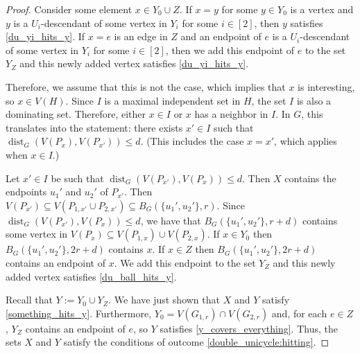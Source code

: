 \documentclass{patmorin}
\DeclareMathOperator{\dist}{dist}
\begin{document}
\begin{proof}
    Consider some element $x\in Y_0\cup Z$.  If $x=y$ for some $y\in Y_0$ is a vertex and $y$ is a $U_i$-descendant of some vertex in $Y_i$ for some $i\in[2]$, then $y$ satisfies \cref{du_yi_hits_y}.  
    If $x=e$ is an edge in $Z$ and an endpoint of $e$ is  a $U_i$-descendant of some vertex in $Y_i$ for some $i\in[2]$, then we add this endpoint of $e$ to the set $Y_Z$ and this newly added vertex satisfies \cref{du_yi_hits_y}. 
    
    Therefore, we assume that this is not the case, which implies that $x$ is interesting, so $x\in V(H)$.
    Since $I$ is a maximal independent set in $H$, the set $I$ is also a dominating set.
    Therefore, either $x\in I$ or $x$ has a neighbor in $I$.  In $G$, this translates into the statement:
    there exists $x'\in I$ such that $\dist_G(V(P_x),V(P_{x'}))\le d$.
    (This includes the case $x=x'$, which applies when $x\in I$.)

    Let $x'\in I$ be such that $\dist_G(V(P_{x'}),V(P_x))\le d$.  Then $X$ contains the endpoints $u_1'$ and $u_2'$ of $P_{x'}$.  Then $V(P_{x'})\subseteq V(P_{1,x'}\cup P_{2,x'})\subseteq B_G(\{u_1',u_2'\},r)$.  Since $\dist_G(V(P_{x'}),V(P_x))\le d$, we have that
    $B_G(\{u_1',u_2'\},r+d)$ contains some vertex in $V(P_x)\subseteq V(P_{1,x})\cup V(P_{2,x})$. If $x\in Y_0$ then $B_G(\{u_1',u_2'\},2r+d)$ contains $x$.  If $x\in Z$  then $B_G(\{u_1',u_2'\},2r+d)$ contains an endpoint of $x$.  We add this endpoint to the set $Y_Z$ and this newly added vertex satisfies \cref{du_ball_hits_y}.

    Recall that $Y:=Y_0\cup Y_Z$.  We have just shown that $X$ and $Y$ satisfy \cref{something_hits_y}.  Furthermore, $Y_0=V(G_{1,r})\cap V(G_{2,r})$ and, for each $e\in Z$, $Y_Z$ contains an endpoint of $e$, so $Y$ satisfies \cref{y_covers_everything}.  Thus, the sets $X$ and $Y$ satisfy the conditions of outcome \cref{double_unicycle:hitting}.
\end{proof}
\end{document}
